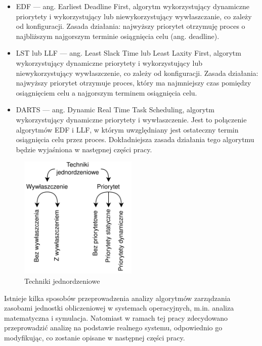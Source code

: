 \documentclass[../../main]{subfiles}
\begin{document}
\begin{itemize}
    \item EDF — ang. Earliest Deadline First, algorytm wykorzystujący dynamiczne priorytety i wykorzystujący lub niewykorzystujący wywłaszczanie, co zależy od konfiguracji. Zasada działania: najwyższy priorytet otrzymuję proces o najbliższym najgorszym terminie osiągnięcia celu (ang. deadline).
    \item LST lub LLF — ang. Least Slack Time lub Least Laxity First, algorytm wykorzystujący dynamiczne priorytety i wykorzystujący lub niewykorzystujący wywłaszczenie, co zależy od konfiguracji. Zasada działania: najwyższy priorytet otrzymuje proces, który ma najmniejszy czas pomiędzy osiągnięciem celu a najgorszym terminem osiągnięcia celu.
    \item DARTS — ang. Dynamic Real Time Task Scheduling, algorytm wykorzystujący dynamiczne priorytety i wywłaszczenie. Jest to połączenie algorytmów EDF i LLF, w którym uwzględniany jest ostateczny termin osiągnięcia celu przez proces. Dokładniejsza zasada działania tego algorytmu będzie wyjaśniona w następnej części pracy. \cite{darts}
\end{itemize}

\begin{figure}[ht]
    \centering
    \includegraphics[width=0.50\textwidth]{Images/uniprocessor-technics.png}
    \caption{Techniki jednordzeniowe}
    \label{fig:uniprocessor-technics}
\end{figure}

Istnieje kilka sposobów przeprowadzenia analizy algorytmów zarządzania zasobami jednostki obliczeniowej w systemach operacyjnych, m.in. analiza matematyczna i symulacja. Natomiast w ramach tej pracy zdecydowano przeprowadzić analizę na podstawie realnego systemu, odpowiednio go modyfikując, co zostanie opisane w następnej części pracy.
\end{document}
